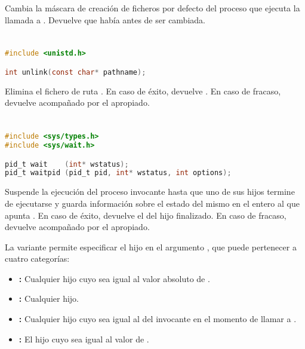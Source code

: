 Cambia la máscara de creación de ficheros por defecto del proceso que ejecuta la llamada a .
Devuelve que había antes de ser cambiada.

\pagebreak

\section{}\label{unlink}

\begin{lstlisting}[language=C]
#include <unistd.h>

int unlink(const char* pathname);
\end{lstlisting}

Elimina el fichero de ruta .
En caso de éxito, devuelve .
En caso de fracaso, devuelve  acompañado por el  apropiado.

\section{}\label{wait}

\begin{lstlisting}[language=C]
#include <sys/types.h>
#include <sys/wait.h>

pid_t wait    (int* wstatus);
pid_t waitpid (pid_t pid, int* wstatus, int options);
\end{lstlisting}

Suspende la ejecución del proceso invocante hasta que uno de sus hijos termine de ejecutarse y guarda información sobre el estado del mismo en el entero al que apunta .
En caso de éxito, devuelve el  del hijo finalizado.
En caso de fracaso, devuelve  acompañado por el  apropiado.

La variante  permite especificar el hijo en el argumento , que puede pertenecer a cuatro categorías:

\begin{itemize}
	\item{}\textbf{:} Cualquier hijo cuyo  sea igual al valor absoluto de .
	\item{}\textbf{:} Cualquier hijo.
	\item{}\textbf{:} Cualquier hijo cuyo  sea igual al del invocante en el momento de llamar a .
	\item{}\textbf{:} El hijo cuyo  sea igual al valor de .
\end{itemize}

